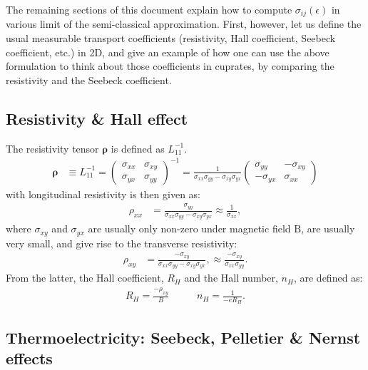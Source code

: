 \documentclass[notitlepage,11pt,nofootinbib]{revtex4-1}
\renewcommand{\vec}[1]{\bm{\mathrm{#1}}}
\begin{document}
The remaining sections of this document explain how to compute $\sigma_{ij}(\epsilon)$ in various limit of the semi-classical approximation. 
First, however, let us define the usual measurable transport coefficients (resistivity, Hall coefficient, Seebeck coefficient, etc.) in 2D, and give an example of how one can use the above formulation to think about those coefficients in cuprates, by comparing the resistivity and the Seebeck coefficient.

\subsection{Resistivity \& Hall effect}

The resistivity tensor $\boldsymbol{\rho}$ is defined as $L_{11}^{-1}$.
\begin{align}
\boldsymbol{\rho} &\equiv L_{11}^{-1}
=
\begin{pmatrix}
\sigma_{xx} & \sigma_{xy}\\
\sigma_{yx} & \sigma_{yy}
\end{pmatrix}^{-1}
=
\frac{1}{\sigma_{xx}\sigma_{yy}-\sigma_{xy}\sigma_{yx}}
\begin{pmatrix}
\sigma_{yy} & -\sigma_{xy}\\
-\sigma_{yx} & \sigma_{xx}
\end{pmatrix}
\end{align}
with longitudinal resistivity is then given as:
\begin{align}
\rho_{xx} 
&= 
\frac{\sigma_{yy}}{\sigma_{xx}\sigma_{yy} - \sigma_{xy}\sigma_{yx}}
\approx
\boxed{
\frac{1}{\sigma_{xx}}
},
\label{eq_resistivity}
\end{align}
where $\sigma_{xy}$ and $\sigma_{yx}$ are usually only non-zero under magnetic field $\vec B$, are usually very small, and give rise to the transverse resistivity:
\begin{align}
\rho_{xy} 
&= 
\frac{-\sigma_{xy}}{\sigma_{xx}\sigma_{yy} - \sigma_{xy}\sigma_{yx}},
\approx
\boxed{
\frac{-\sigma_{xy}}{\sigma_{xx}\sigma_{yy}}
}.
\end{align}
From the latter, the Hall coefficient, $R_H$ and the Hall number, $n_H$, are defined as:
\begin{align}
R_H = \frac{-\rho_{xy}}{B}
&\qquad
n_H = \frac{1}{-eR_H}.
\end{align}



\subsection{Thermoelectricity: Seebeck, Pelletier \& Nernst effects}
\end{document}
